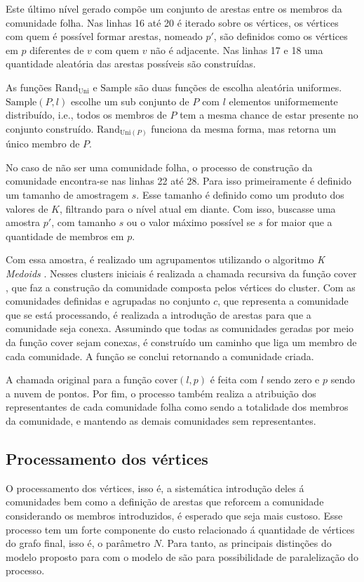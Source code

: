 \documentclass[notes.tex]{subfiles}
\begin{document}
Este último nível gerado compõe um conjunto de arestas entre os membros da comunidade folha.
Nas linhas 16 até 20 é iterado sobre os vértices, os vértices com quem é possível formar arestas, nomeado $p'$, são definidos como os vértices em $p$ diferentes de $v$ com quem $v$ não é adjacente.
Nas linhas 17 e 18 uma quantidade aleatória das arestas possíveis são construídas.

As funções $\text{Rand}_{\text{Uni}}$ e $\text{Sample}$ são duas funções de escolha aleatória uniformes.
$\text{Sample}(P, l)$ escolhe um sub conjunto de $P$ com $l$ elementos uniformemente distribuído, i.e., todos os membros de $P$ tem a mesma chance de estar presente no conjunto construído.
$\text{Rand}_{\text{Uni}(P)}$ funciona da mesma forma, mas retorna um único membro de $P$.

No caso de não ser uma comunidade folha, o processo de construção da comunidade encontra-se nas linhas 22 até 28.
Para isso primeiramente é definido um tamanho de amostragem $s$.
Esse tamanho é definido como um produto dos valores de $K$, filtrando para o nível atual em diante.
Com isso, buscasse uma amostra $p'$, com tamanho  $s$ ou o valor máximo possível se  $s$ for maior que a quantidade de membros em  $p$.

Com essa amostra, é realizado um agrupamentos utilizando o algoritmo \emph{K Medoids} \cite{largeron2015generating}.
Nesses clusters iniciais é realizada a chamada recursiva da função $\text{cover}$, que faz a construção da comunidade composta pelos vértices do cluster.
Com as comunidades definidas e agrupadas no conjunto $c$, que representa a comunidade que se está processando, é realizada a introdução de arestas para que a comunidade seja conexa.
Assumindo que todas as comunidades geradas por meio da função  $\text{cover}$ sejam conexas, é construído um caminho que liga um membro de cada comunidade.
A função se conclui retornando a comunidade criada.

A chamada original para a função $\text{cover}(l, p)$ é feita com $l$ sendo zero e  $p$ sendo a nuvem de pontos.
Por fim, o processo também realiza a atribuição dos representantes de cada comunidade folha como sendo a totalidade dos membros da comunidade, e mantendo as demais comunidades sem representantes.

\subsection{Processamento dos vértices}

O processamento dos vértices, isso é, a sistemática introdução deles á comunidades bem como a definição de arestas que reforcem a comunidade considerando os membros introduzidos, é esperado que seja mais custoso.
Esse processo tem um forte componente do custo relacionado á quantidade de vértices do grafo final, isso é, o parâmetro $N$.
Para tanto, as principais distinções do modelo proposto para com o modelo de  são para possibilidade de paralelização do processo.
\end{document}
